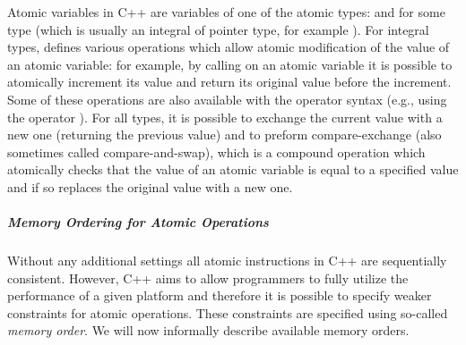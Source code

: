 Atomic variables in C++ are variables of one of the atomic types:
 and  for some type  (which is
usually an integral of pointer type, for example ).
For integral types,  defines various operations which allow
atomic modification of the value of an atomic variable: for example, by calling
 on an atomic variable it is possible to atomically increment
its value and return its original value before the increment.
Some of these operations are also available with the operator syntax (e.g.,
using the operator \cpp{+=}).
For all types, it is possible to exchange the current value with a new one
(returning the previous value) and to preform compare-exchange (also sometimes
called compare-and-swap), which is a compound operation which atomically checks
that the value of an atomic variable is equal to a specified value and if so
replaces the original value with a new one.

\subparagraph{Memory Ordering for Atomic Operations} \label{sec:prelim:cppmemord}

Without any additional settings all atomic instructions in C++ are sequentially
consistent.
However, C++ aims to allow programmers to fully utilize the performance of a
given platform and therefore it is possible to specify weaker constraints for
atomic operations.
These constraints are specified using so-called \emph{memory order}.
We will now informally describe available memory orders.


